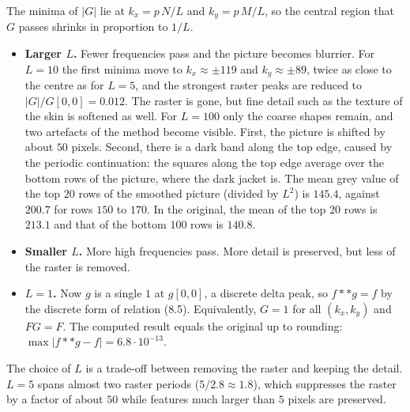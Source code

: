 The minima of $|G|$ lie at $k_x = p\,N/L$ and $k_y = p\,M/L$, so the central region that $G$ passes shrinks in proportion to $1/L$.
\begin{itemize}
    \item \textbf{Larger $L$.} Fewer frequencies pass and the picture becomes blurrier. For $L = 10$ the first minima move to $k_x \approx \pm 119$ and $k_y \approx \pm 89$, twice as close to the centre as for $L = 5$, and the strongest raster peaks are reduced to $|G|/G[0,0] = 0.012$. The raster is gone, but fine detail such as the texture of the skin is softened as well. For $L = 100$ only the coarse shapes remain, and two artefacts of the method become visible. First, the picture is shifted by about $50$ pixels. Second, there is a dark band along the top edge, caused by the periodic continuation: the squares along the top edge average over the bottom rows of the picture, where the dark jacket is. The mean grey value of the top $20$ rows of the smoothed picture (divided by $L^2$) is $145.4$, against $200.7$ for rows $150$ to $170$. In the original, the mean of the top $20$ rows is $213.1$ and that of the bottom $100$ rows is $140.8$.
    \item \textbf{Smaller $L$.} More high frequencies pass. More detail is preserved, but less of the raster is removed.
    \item \textbf{$L = 1$.} Now $g$ is a single $1$ at $g[0,0]$, a discrete delta peak, so $f ** g = f$ by the discrete form of relation (8.5). Equivalently, $G = 1$ for all $(k_x, k_y)$ and $FG = F$. The computed result equals the original up to rounding: $\max |f ** g - f| = 6.8 \cdot 10^{-13}$.
\end{itemize}

The choice of $L$ is a trade-off between removing the raster and keeping the detail. $L = 5$ spans almost two raster periods ($5 / 2.8 \approx 1.8$), which suppresses the raster by a factor of about $50$ while features much larger than $5$ pixels are preserved.
